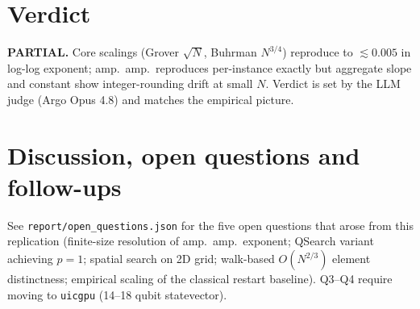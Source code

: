 \documentclass[11pt]{article}
\begin{document}
\section{Verdict}
\textbf{PARTIAL.} Core scalings (Grover $\sqrt{N}$, Buhrman $N^{3/4}$) reproduce
to $\lesssim 0.005$ in log-log exponent; amp.\ amp.\ reproduces per-instance
exactly but aggregate slope and constant show integer-rounding drift at small
$N$. Verdict is set by the LLM judge (Argo Opus 4.8) and matches the empirical
picture.

\section{Discussion, open questions and follow-ups}
See \texttt{report/open\_questions.json} for the five open questions that
arose from this replication (finite-size resolution of amp.\ amp.\ exponent;
QSearch variant achieving $p=1$; spatial search on 2D grid; walk-based
$O(N^{2/3})$ element distinctness; empirical scaling of the classical
restart baseline). Q3--Q4 require moving to \texttt{uicgpu} (14--18 qubit
statevector).
\end{document}
